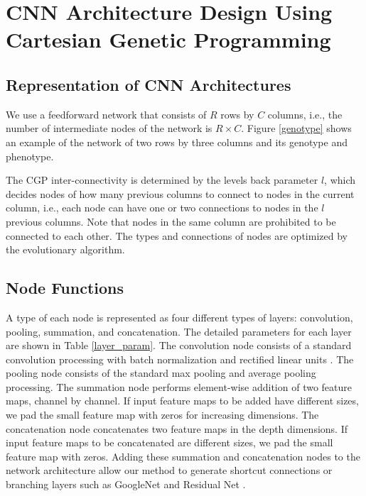 \section{CNN Architecture Design Using Cartesian Genetic Programming}


\subsection{Representation of CNN Architectures}
We use a feedforward network that consists of $R$ rows by $C$ columns, i.e., the number of intermediate nodes of the network is $R\times C$.
Figure \ref{genotype} shows an example of the network of two rows by three columns and its genotype and phenotype.

The CGP inter-connectivity is determined by the levels back parameter $l$, which decides nodes of how many previous columns to connect to nodes in the current column, i.e., each node can have one or two connections to nodes in the $l$ previous columns.
Note that nodes in the same column are prohibited to be connected to each other.
The types and connections of nodes are optimized by the evolutionary algorithm.

\subsection{Node Functions}
A type of each node is represented as four different types of layers: convolution, pooling, summation, and concatenation.
The detailed parameters for each layer are shown in Table \ref{layer_param}.
The convolution node consists of a standard convolution processing with batch normalization \cite{ioffe_batch_2015} and rectified linear units \cite{nair_rectified_2010}.
The pooling node consists of the standard max pooling and average pooling processing.
The summation node performs element-wise addition of two feature maps, channel by channel. 
If input feature maps to be added have different sizes, we pad the small feature map with zeros for increasing dimensions.
The concatenation node concatenates two feature maps in the depth dimensions.
If input feature maps to be concatenated are different sizes, we pad the small feature map with zeros.
Adding these summation and concatenation nodes to the network architecture allow our method to generate shortcut connections or branching layers such as GoogleNet \cite{szegedy_going_2015} and Residual Net \cite{he_deep_2016}.

